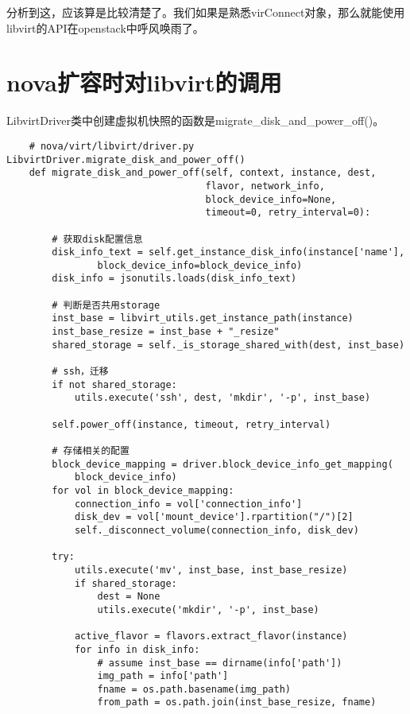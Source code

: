 \documentclass[a4paper,left=1.5cm,right=1.5cm,11pt]{article}
\begin{document}
	分析到这，应该算是比较清楚了。我们如果是熟悉virConnect对象，那么就能使用libvirt的API在openstack中呼风唤雨了。\par

\clearpage

\section{nova扩容时对libvirt的调用}
	LibvirtDriver类中创建虚拟机快照的函数是migrate_disk_and_power_off()。

	\begin{lstlisting}
	# nova/virt/libvirt/driver.py LibvirtDriver.migrate_disk_and_power_off()
	def migrate_disk_and_power_off(self, context, instance, dest,
                                   flavor, network_info,
                                   block_device_info=None,
                                   timeout=0, retry_interval=0):
		
		# 获取disk配置信息
        disk_info_text = self.get_instance_disk_info(instance['name'],
                block_device_info=block_device_info)
		disk_info = jsonutils.loads(disk_info_text)

        # 判断是否共用storage
        inst_base = libvirt_utils.get_instance_path(instance)
        inst_base_resize = inst_base + "_resize"
        shared_storage = self._is_storage_shared_with(dest, inst_base)

		# ssh，迁移
        if not shared_storage:
            utils.execute('ssh', dest, 'mkdir', '-p', inst_base)

        self.power_off(instance, timeout, retry_interval)

		# 存储相关的配置
        block_device_mapping = driver.block_device_info_get_mapping(
            block_device_info)
        for vol in block_device_mapping:
            connection_info = vol['connection_info']
            disk_dev = vol['mount_device'].rpartition("/")[2]
            self._disconnect_volume(connection_info, disk_dev)

        try:
            utils.execute('mv', inst_base, inst_base_resize)
            if shared_storage:
                dest = None
                utils.execute('mkdir', '-p', inst_base)

            active_flavor = flavors.extract_flavor(instance)
            for info in disk_info:
                # assume inst_base == dirname(info['path'])
                img_path = info['path']
                fname = os.path.basename(img_path)
                from_path = os.path.join(inst_base_resize, fname)


\end{lstlisting}
\end{document}
